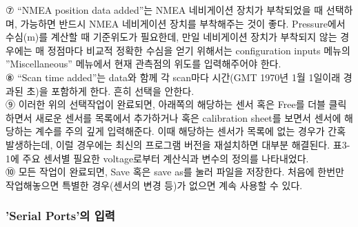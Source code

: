 \documentclass[
]{book}
\begin{document}
⑦ ``NMEA position data added''는 NMEA 네비게이션 장치가 부착되었을 때 선택하며, 가능하면 반드시 NMEA 네비게이션 장치를 부착해주는 것이 좋다. Pressure에서 수심(m)를 계산할 때 기준위도가 필요한데, 만일 네비게이션 장치가 부착되지 않는 경우에는 매 정점마다 비교적 정확한 수심을 얻기 위해서는 configuration inputs 메뉴의 ''Miscellaneous'' 메뉴에서 현재 관측점의 위도를 입력해주어야 한다.\\
⑧ ``Scan time added''는 data와 함께 각 scan마다 시간(GMT 1970년 1월 1일이래 경과된 초)을 포함하게 한다. 흔히 선택을 안한다.\\
⑨ 이러한 위의 선택작업이 완료되면, 아래쪽의 해당하는 센서 혹은 Free를 더블 클릭하면서 새로운 센서를 목록에서 추가하거나 혹은 calibration sheet를 보면서 센서에 해당하는 계수를 주의 깊게 입력해준다. 이때 해당하는 센서가 목록에 없는 경우가 간혹 발생하는데, 이럴 경우에는 최신의 프로그램 버전을 재설치하면 대부분 해결된다. 표3-1에 주요 센서별 필요한 voltage로부터 계산식과 변수의 정의를 나타내었다.\\
⑩ 모든 작업이 완료되면, Save 혹은 save as를 눌러 파일을 저장한다. 처음에 한번만 작업해놓으면 특별한 경우(센서의 변경 등)가 없으면 계속 사용할 수 있다.

\hypertarget{serial-portsuxc758-uxc785uxb825}{%
\subsubsection{'Serial Ports'의 입력}\label{serial-portsuxc758-uxc785uxb825}}
\end{document}

